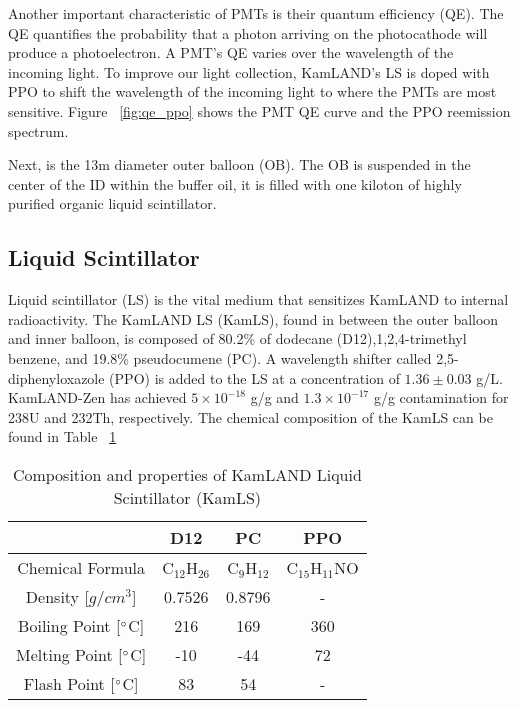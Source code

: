 Another important characteristic of PMTs is their quantum efficiency (QE). The QE quantifies the probability that a photon arriving on the photocathode will produce a photoelectron. A PMT's QE varies over the wavelength of the incoming light. To improve our light collection, KamLAND's LS is doped with PPO to shift the wavelength of the incoming light to where the PMTs are most sensitive. Figure ~\ref{fig:qe_ppo} shows the PMT QE curve and the PPO reemission spectrum.

Next, is the 13m diameter outer balloon (OB). The OB is suspended in the center of the ID within the buffer oil, it is filled with one kiloton of highly purified organic liquid scintillator.

\subsection{Liquid Scintillator}
Liquid scintillator (LS) is the vital medium that sensitizes KamLAND to internal radioactivity. The KamLAND LS (KamLS), found in between the outer balloon and inner balloon, is composed of 80.2\% of dodecane (D12),1,2,4-trimethyl benzene, and 19.8\% pseudocumene (PC). A wavelength shifter called 2,5-diphenyloxazole (PPO) is added to the LS at a concentration of $1.36 \pm 0.03$ g/L. KamLAND-Zen has achieved $5 \times 10^{-18}$ g/g and $1.3 \times 10^{-17}$ g/g contamination for 238U and 232Th, respectively. The chemical composition of the KamLS can be found in Table ~\ref{tbl:kamls}

\begin{table}[h]
	\centering
	\renewcommand{\arraystretch}{1.2}
	\begin{tabular}{c|ccc}
		\hline
		& D12 & PC & PPO \\
		\hline
		Chemical Formula & C$_{12}$H$_{26}$ & C$_9$H$_{12}$ & C$_{15}$H$_{11}$NO \\
		Density [$g/cm^3$] & 0.7526 & 0.8796 & -\\
		Boiling Point [$\degree$C] & 216 & 169 & 360 \\
		Melting Point [$\degree$C] & -10 & -44 & 72 \\
		Flash Point [$\degree$C] & 83 & 54 & - \\ \hline
	\end{tabular}
	\caption{Composition and properties of KamLAND Liquid Scintillator (KamLS)}
	\label{tbl:kamls}
\end{table}

